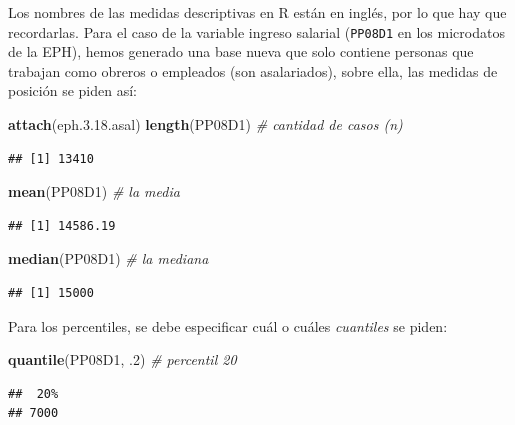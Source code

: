 \documentclass[]{book}
\newenvironment{Shaded}{\begin{snugshade}}{\end{snugshade}}
\newcommand{\CommentTok}[1]{\textcolor[rgb]{0.56,0.35,0.01}{\textit{#1}}}
\newcommand{\DecValTok}[1]{\textcolor[rgb]{0.00,0.00,0.81}{#1}}
\newcommand{\FloatTok}[1]{\textcolor[rgb]{0.00,0.00,0.81}{#1}}
\newcommand{\KeywordTok}[1]{\textcolor[rgb]{0.13,0.29,0.53}{\textbf{#1}}}
\newcommand{\NormalTok}[1]{#1}
\begin{document}
Los nombres de las medidas descriptivas en R están en inglés, por lo que hay que recordarlas. Para el caso de la variable ingreso salarial (\texttt{PP08D1} en los microdatos de la EPH), hemos generado una base nueva que solo contiene personas que trabajan como obreros o empleados (son asalariados), sobre ella, las medidas de posición se piden así:

\begin{Shaded}
\begin{Highlighting}[]
\KeywordTok{attach}\NormalTok{(eph.}\DecValTok{3}\NormalTok{.}\FloatTok{18.}\NormalTok{asal)}
\KeywordTok{length}\NormalTok{(PP08D1) }\CommentTok{# cantidad de casos (n)}
\end{Highlighting}
\end{Shaded}

\begin{verbatim}
## [1] 13410
\end{verbatim}

\begin{Shaded}
\begin{Highlighting}[]
\KeywordTok{mean}\NormalTok{(PP08D1) }\CommentTok{# la media}
\end{Highlighting}
\end{Shaded}

\begin{verbatim}
## [1] 14586.19
\end{verbatim}

\begin{Shaded}
\begin{Highlighting}[]
\KeywordTok{median}\NormalTok{(PP08D1) }\CommentTok{# la mediana}
\end{Highlighting}
\end{Shaded}

\begin{verbatim}
## [1] 15000
\end{verbatim}

Para los percentiles, se debe especificar cuál o cuáles \emph{cuantiles} se piden:

\begin{Shaded}
\begin{Highlighting}[]
\KeywordTok{quantile}\NormalTok{(PP08D1, }\FloatTok{.2}\NormalTok{) }\CommentTok{# percentil 20}
\end{Highlighting}
\end{Shaded}

\begin{verbatim}
##  20% 
## 7000
\end{verbatim}
\end{document}
